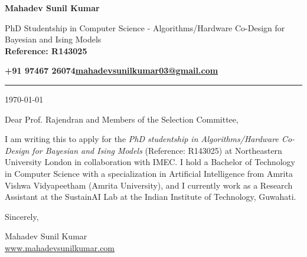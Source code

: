\documentclass[11pt]{article}
\makeatletter
\newcommand{\myname}{Mahadev Sunil Kumar}
\newcommand{\myaddress}{PhD Studentship in Computer Science - Algorithms/Hardware Co-Design for Bayesian and Ising Models\\ \textbf{Reference: R143025}}
\newcommand{\myphone}{+91 97467 26074}
\newcommand{\myemail}{mahadevsunilkumar03@gmail.com}
\newcommand{\letterdate}{\today}
\makeatother
\begin{document}
\begin{center}
  \vspace*{-1.8em}
  {\fontsize{22}{27}\selectfont\bfseries\myname}\par
  \vspace{-0.5em}
  {\myaddress}\par
\end{center}
\vspace{-1.2em}
{\bfseries \myphone \hfill \href{mailto:\myemail}{\myemail}}\par
\vspace{-0.8em}
\rule{\linewidth}{0.8pt}


\letterdate

Dear Prof. Rajendran and Members of the Selection Committee,

I am writing this to apply for the \textit{PhD studentship in Algorithms/Hardware Co-Design for Bayesian and Ising Models} (Reference: R143025) at Northeastern University London in collaboration with IMEC. I hold a Bachelor of Technology in Computer Science with a specialization in Artificial Intelligence from Amrita Vishwa Vidyapeetham (Amrita University), and I currently work as a Research Assistant at the SustainAI Lab at the Indian Institute of Technology, Guwahati.



Sincerely,

\myname\\
\href{https://www.mahadevsunilkumar.com}{www.mahadevsunilkumar.com}
\end{document}

